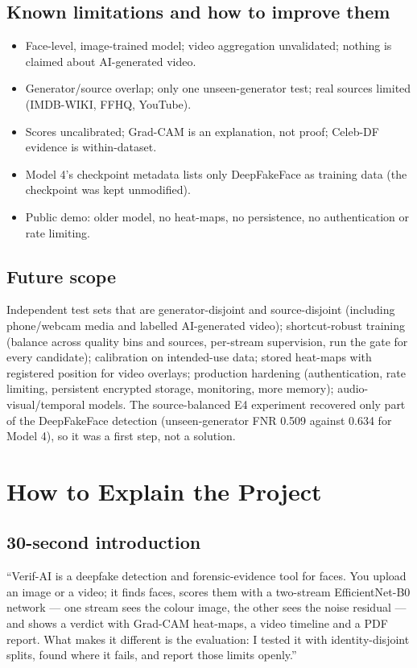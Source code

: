 \documentclass[11pt,a4paper]{report}
\begin{document}
\section{Known limitations and how to improve them}
\begin{itemize}
\item Face-level, image-trained model; video aggregation unvalidated; nothing is claimed about AI-generated video.
\item Generator/source overlap; only one unseen-generator test; real sources limited (IMDB-WIKI, FFHQ, YouTube).
\item Scores uncalibrated; Grad-CAM is an explanation, not proof; Celeb-DF evidence is within-dataset.
\item Model 4's checkpoint metadata lists only DeepFakeFace as training data (the checkpoint was kept unmodified).
\item Public demo: older model, no heat-maps, no persistence, no authentication or rate limiting.
\end{itemize}

\section{Future scope}
Independent test sets that are generator-disjoint and source-disjoint (including phone/webcam media and labelled AI-generated video); shortcut-robust training (balance across quality bins and sources, per-stream supervision, run the gate for every candidate); calibration on intended-use data; stored heat-maps with registered position for video overlays; production hardening (authentication, rate limiting, persistent encrypted storage, monitoring, more memory); audio-visual/temporal models. The source-balanced E4 experiment recovered only part of the DeepFakeFace detection (unseen-generator FNR 0.509 against 0.634 for Model 4), so it was a first step, not a solution.

\chapter{How to Explain the Project}

\section{30-second introduction}
\begin{sayit}
``Verif-AI is a deepfake detection and forensic-evidence tool for faces. You upload an image or a video; it finds faces, scores them with a two-stream EfficientNet-B0 network --- one stream sees the colour image, the other sees the noise residual --- and shows a verdict with Grad-CAM heat-maps, a video timeline and a PDF report. What makes it different is the evaluation: I tested it with identity-disjoint splits, found where it fails, and report those limits openly.''
\end{sayit}
\end{document}
